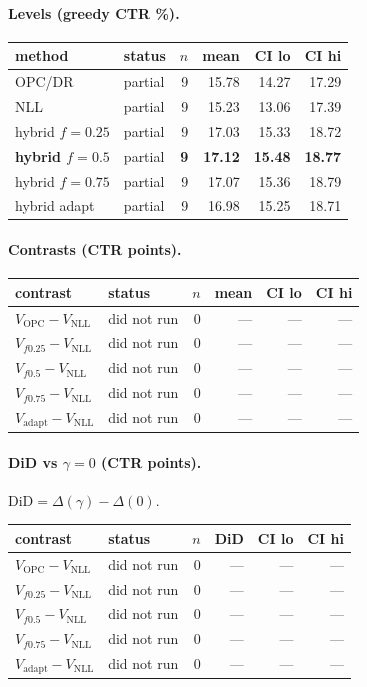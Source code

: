 \documentclass[10pt,a4paper]{article}
\begin{document}
\paragraph{Levels (greedy CTR \%).}
{\centering\small\begin{tabular}{llrrrr}
\toprule method & status & $n$ & mean & CI lo & CI hi \\
\midrule
OPC/DR & partial & 9 & 15.78 & 14.27 & 17.29 \\
NLL & partial & 9 & 15.23 & 13.06 & 17.39 \\
hybrid $f{=}0.25$ & partial & 9 & 17.03 & 15.33 & 18.72 \\
\textbf{hybrid $f{=}0.5$} & partial & \textbf{9} & \textbf{17.12} & \textbf{15.48} & \textbf{18.77} \\
hybrid $f{=}0.75$ & partial & 9 & 17.07 & 15.36 & 18.79 \\
hybrid adapt & partial & 9 & 16.98 & 15.25 & 18.71 \\
\bottomrule\end{tabular}\par}
\paragraph{Contrasts (CTR points).}
{\centering\small\begin{tabular}{llrrrr}
\toprule contrast & status & $n$ & mean & CI lo & CI hi \\
\midrule
$V_{\mathrm{OPC}}-V_{\mathrm{NLL}}$ & did not run & 0 & --- & --- & --- \\
$V_{f0.25}-V_{\mathrm{NLL}}$ & did not run & 0 & --- & --- & --- \\
$V_{f0.5}-V_{\mathrm{NLL}}$ & did not run & 0 & --- & --- & --- \\
$V_{f0.75}-V_{\mathrm{NLL}}$ & did not run & 0 & --- & --- & --- \\
$V_{\mathrm{adapt}}-V_{\mathrm{NLL}}$ & did not run & 0 & --- & --- & --- \\
\bottomrule\end{tabular}\par}
\paragraph{DiD vs $\gamma=0$ (CTR points).} $\mathrm{DiD}=\Delta(\gamma)-\Delta(0)$.
{\centering\small\begin{tabular}{llrrrr}
\toprule contrast & status & $n$ & DiD & CI lo & CI hi \\
\midrule
$V_{\mathrm{OPC}}-V_{\mathrm{NLL}}$ & did not run & 0 & --- & --- & --- \\
$V_{f0.25}-V_{\mathrm{NLL}}$ & did not run & 0 & --- & --- & --- \\
$V_{f0.5}-V_{\mathrm{NLL}}$ & did not run & 0 & --- & --- & --- \\
$V_{f0.75}-V_{\mathrm{NLL}}$ & did not run & 0 & --- & --- & --- \\
$V_{\mathrm{adapt}}-V_{\mathrm{NLL}}$ & did not run & 0 & --- & --- & --- \\
\bottomrule\end{tabular}\par}
\bigskip
\end{document}
